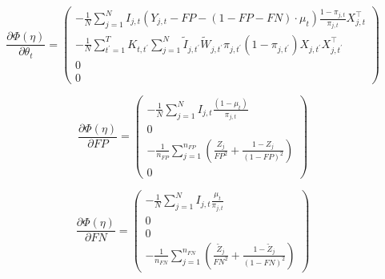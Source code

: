\documentclass[11pt]{amsart}
\numberwithin{equation}{section}
\theoremstyle{plain}
\begin{document}
$$
\frac{\partial \Phi (\eta)}{\partial \theta_t} =
\left (
\begin{array}{c}
-\frac{1}{N} \sum_{j=1}^N I_{j,t} (Y_{j,t} - FP - (1-FP-FN) \cdot \mu_t) \frac{1-\pi_{j,t}}{\pi_{j,t}} X_{j,t}^\top \\
- \frac{1}{N} \sum_{t^\prime = 1}^T K_{t,t^\prime} \sum_{j = 1}^N \tilde I_{j,t^\prime} \tilde W_{j,t^\prime}  \pi_{j,t^\prime} (1-\pi_{j,t^\prime}) X_{j,t^\prime} X_{j,t^\prime}^\top\\
0 \\
0
\end{array}
\right )
$$

$$
\frac{\partial \Phi (\eta)}{\partial FP} =
\left (
\begin{array}{c}
-\frac{1}{N} \sum_{j=1}^N I_{j,t} \frac{(1-\mu_t)}{\pi_{j,t}} \\
0\\
-\frac{1}{n_{FP}} \sum_{j=1}^{n_{FP}} \left( \frac{Z_j}{FP^2} + \frac{1-Z_j}{(1-FP)^2} \right)  \\
0
\end{array}
\right )
$$

$$
\frac{\partial \Phi (\eta)}{\partial FN} =
\left (
\begin{array}{c}
- \frac{1}{N} \sum_{j=1}^N I_{j,t} \frac{\mu_t}{\pi_{j,t}} \\
0\\
0 \\
-\frac{1}{n_{FN}}  \sum_{j =1}^{n_{FN}} \left( \frac{\tilde Z_j}{FN^2} + \frac{1-\tilde Z_j}{(1-FN)^2} \right)
\end{array}
\right )
$$
\end{document}
